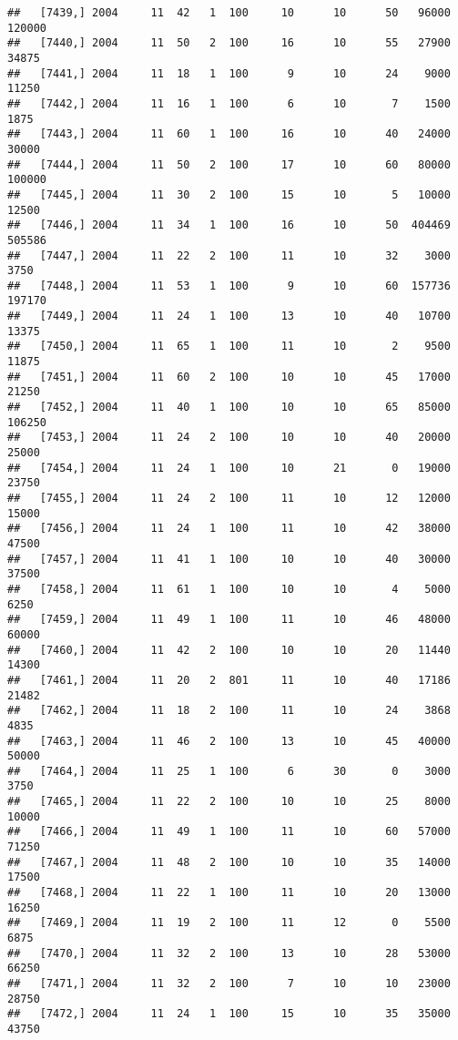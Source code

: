 \documentclass{article}\usepackage[]{graphicx}\usepackage[]{color}
\makeatletter
\newenvironment{kframe}{%
 \def\at@end@of@kframe{}%
 \ifinner\ifhmode%
  \def\at@end@of@kframe{\end{minipage}}%
  \begin{minipage}{\columnwidth}%
 \fi\fi%
 \def\FrameCommand##1{\hskip\@totalleftmargin \hskip-\fboxsep
 \colorbox{shadecolor}{##1}\hskip-\fboxsep
     \hskip-\linewidth \hskip-\@totalleftmargin \hskip\columnwidth}%
 \MakeFramed {\advance\hsize-\width
   \@totalleftmargin\z@ \linewidth\hsize
   \@setminipage}}%
 {\par\unskip\endMakeFramed%
 \at@end@of@kframe}
\newenvironment{knitrout}{}{} %
\makeatother
\begin{document}
\begin{knitrout}
\begin{kframe}
\begin{verbatim}
##   [7439,] 2004     11  42   1  100     10      10      50   96000  120000
##   [7440,] 2004     11  50   2  100     16      10      55   27900   34875
##   [7441,] 2004     11  18   1  100      9      10      24    9000   11250
##   [7442,] 2004     11  16   1  100      6      10       7    1500    1875
##   [7443,] 2004     11  60   1  100     16      10      40   24000   30000
##   [7444,] 2004     11  50   2  100     17      10      60   80000  100000
##   [7445,] 2004     11  30   2  100     15      10       5   10000   12500
##   [7446,] 2004     11  34   1  100     16      10      50  404469  505586
##   [7447,] 2004     11  22   2  100     11      10      32    3000    3750
##   [7448,] 2004     11  53   1  100      9      10      60  157736  197170
##   [7449,] 2004     11  24   1  100     13      10      40   10700   13375
##   [7450,] 2004     11  65   1  100     11      10       2    9500   11875
##   [7451,] 2004     11  60   2  100     10      10      45   17000   21250
##   [7452,] 2004     11  40   1  100     10      10      65   85000  106250
##   [7453,] 2004     11  24   2  100     10      10      40   20000   25000
##   [7454,] 2004     11  24   1  100     10      21       0   19000   23750
##   [7455,] 2004     11  24   2  100     11      10      12   12000   15000
##   [7456,] 2004     11  24   1  100     11      10      42   38000   47500
##   [7457,] 2004     11  41   1  100     10      10      40   30000   37500
##   [7458,] 2004     11  61   1  100     10      10       4    5000    6250
##   [7459,] 2004     11  49   1  100     11      10      46   48000   60000
##   [7460,] 2004     11  42   2  100     10      10      20   11440   14300
##   [7461,] 2004     11  20   2  801     11      10      40   17186   21482
##   [7462,] 2004     11  18   2  100     11      10      24    3868    4835
##   [7463,] 2004     11  46   2  100     13      10      45   40000   50000
##   [7464,] 2004     11  25   1  100      6      30       0    3000    3750
##   [7465,] 2004     11  22   2  100     10      10      25    8000   10000
##   [7466,] 2004     11  49   1  100     11      10      60   57000   71250
##   [7467,] 2004     11  48   2  100     10      10      35   14000   17500
##   [7468,] 2004     11  22   1  100     11      10      20   13000   16250
##   [7469,] 2004     11  19   2  100     11      12       0    5500    6875
##   [7470,] 2004     11  32   2  100     13      10      28   53000   66250
##   [7471,] 2004     11  32   2  100      7      10      10   23000   28750
##   [7472,] 2004     11  24   1  100     15      10      35   35000   43750

\end{verbatim}
\end{kframe}
\end{knitrout}
\end{document}
